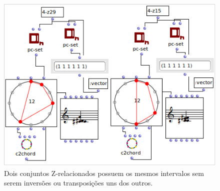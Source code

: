 \documentclass[
	12pt,				%
	openright,			%
	twoside,			%
	a4paper,			%
	english,			%
	french,				%
	spanish,			%
	brazil				%
	]{abntex2}
\begin{document}
\begin{apendicesenv}
\begin{figure}[!h]
	\caption{\label{fig_grafico}Dois conjuntos Z-relacionados possuem os mesmos intervalos sem serem inversões ou transposições uns dos outros. }
	\begin{center}
	    \includegraphics[scale=0.7]{OM_settheory/Z_related.png}
	\end{center}
\end{figure}

\end{apendicesenv}













\printindex
\end{document}
